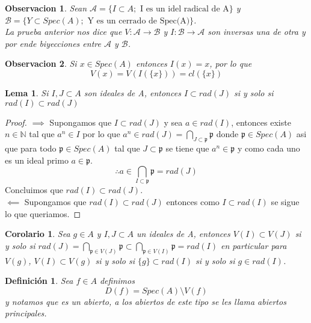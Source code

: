 \documentclass{article}
\newtheorem{definition}{Definición}
\newtheorem{corollary}{Corolario}
\newtheorem{lemma}{Lema}
\newtheorem{observation}{Observacion}
\begin{document}
\begin{observation}
    Sean $\mathcal{A} = \{I \subset A; \mbox{ I es un idel radical de A}\}$
    y $\mathcal{B} = \{Y \subset Spec(A); \mbox{ Y es un cerrado de Spec(A)}\}$.\\
    La prueba anterior nos dice que $V:\mathcal{A} \rightarrow \mathcal{B}$ y 
    $I: \mathcal{B} \rightarrow \mathcal{A}$ son inversas una de otra y por ende
    biyecciones entre $\mathcal{A}$ y $\mathcal{B}$.
\end{observation}

\begin{observation}
    Si $x\in Spec(A)$ entonces $I({x})=x$, por lo que
    $$V(x)=V(I(\{x\}))=cl(\{x\})$$
\end{observation}

\begin{lemma}
    Si $I, J \subset A$ son ideales de A, entonces 
    $I \subset rad(J)$ si y solo si $rad(I)\subset rad(J)$
\end{lemma}
\begin{proof}
    $\implies$ Supongamos que $I \subset rad(J)$ y sea $a \in rad(I)$,
    entonces existe $n \in \mathbb{N}$ tal que $a^n \in I$ por lo que 
    $a^n \in rad(J) = \bigcap_{J\subset \mathfrak{p}}\mathfrak{p}$ donde $\mathfrak{p}\in Spec(A)$
    asi que para todo $\mathfrak{p} \in Spec(A)$ tal que $J\subset \mathfrak{p}$
    se tiene que $a^n \in \mathfrak{p}$ y como cada uno es un ideal primo
    $a\in \mathfrak{p}$.
    $$\therefore a \in \bigcap_{I\subset \mathfrak{p}}\mathfrak{p} = rad(J)$$
    Concluimos que $rad(I) \subset rad(J)$.\\
    $\impliedby$ Supongamos que $rad(I)\subset rad(J)$ entonces como 
    $I\subset rad(I)$ se sigue lo que queriamos.
\end{proof}

\begin{corollary}
    Sea $g \in A$ y $I, J \subset A$ un ideales de A,
    entonces $V(I) \subset V(J)$ si y solo si $rad(J)= \bigcap_{\mathfrak{p} \in V(J)} \mathfrak{p}\subset \bigcap_{\mathfrak{p}\in V(I)}\mathfrak{p} =rad(I)$
    en particular para $V(g)$, $V(I) \subset V(g)$ si y solo si  $\{g\} \subset rad(I)$
    si y solo si $g \in rad(I)$.

\end{corollary}


\begin{definition}
    Sea $f\in A$ definimos
    $$D(f) = Spec(A) \setminus V(f)$$
    y notamos que es un abierto, a los abiertos de 
    este tipo se les llama abiertos principales.
\end{definition}
\end{document}
